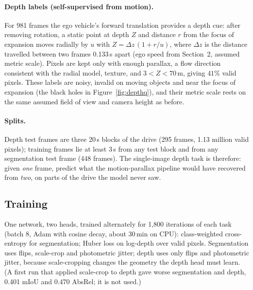 \paragraph{Depth labels (self-supervised from motion).} For 981 frames the ego vehicle's forward translation provides a depth cue: after removing rotation, a static point at depth $Z$ and distance $r$ from the focus of expansion moves radially by $u$ with $Z=\Delta z\,(1+r/u)$, where $\Delta z$ is the distance travelled between two frames 0.133\,s apart (ego speed from Section~2, assumed metric scale). Pixels are kept only with enough parallax, a flow direction consistent with the radial model, texture, and $3<Z<70$\,m, giving $41\%$ valid pixels. These labels are noisy, invalid on moving objects and near the focus of expansion (the black holes in Figure~\ref{fig:depthq}), and their metric scale rests on the same assumed field of view and camera height as before.

\paragraph{Splits.} Depth test frames are three 20\,s blocks of the drive (295 frames, 1.13 million valid pixels); training frames lie at least 3\,s from any test block and from any segmentation test frame (448 frames). The single-image depth task is therefore: given \emph{one} frame, predict what the motion-parallax pipeline would have recovered from \emph{two}, on parts of the drive the model never saw.

\subsection{Training}
One network, two heads, trained alternately for 1{,}800 iterations of each task (batch 8, Adam with cosine decay, about 30\,min on CPU): class-weighted cross-entropy for segmentation; Huber loss on log-depth over valid pixels. Segmentation uses flips, scale-crop and photometric jitter; depth uses only flips and photometric jitter, because scale-cropping changes the geometry the depth head must learn. (A first run that applied scale-crop to depth gave worse segmentation and depth, 0.401 mIoU and 0.470 AbsRel; it is not used.)

